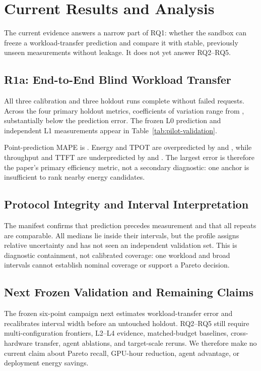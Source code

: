 \section{Current Results and Analysis}

The current evidence answers a narrow part of RQ1: whether the sandbox can
freeze a workload-transfer prediction and compare it with stable, previously
unseen measurements without leakage.  It does not yet answer RQ2--RQ5.

\subsection{R1a: End-to-End Blind Workload Transfer}

All three calibration and three holdout runs complete without failed requests.
Across the four primary holdout metrics, coefficients of variation range from
\PilotCVRange{}, substantially below the prediction error.  The frozen L0
prediction and independent L1 measurements appear in
Table~\ref{tab:pilot-validation}.



Point-prediction MAPE is \PilotMeanMAPE{}.  Energy and TPOT are overpredicted by
\PilotEnergyAPE{} and \PilotTPOTAPE{}, while throughput and TTFT are
underpredicted by \PilotThroughputAPE{} and \PilotTTFTAPE{}.  The largest error
is therefore the paper's primary efficiency metric, not a secondary diagnostic:
one anchor is insufficient to rank nearby energy candidates.

\subsection{Protocol Integrity and Interval Interpretation}

The manifest confirms that prediction precedes measurement and that all repeats
are comparable.  All \PilotCoverage{} medians lie inside their intervals, but
the profile assigns \PilotRelativeUncertainty{} relative uncertainty and has
not seen an independent validation set.  This is diagnostic containment, not
calibrated coverage: one workload and broad intervals cannot establish nominal
coverage or support a Pareto decision.

\subsection{Next Frozen Validation and Remaining Claims}

The frozen six-point campaign next estimates workload-transfer error and
recalibrates interval width before an untouched holdout.  RQ2--RQ5 still require
multi-configuration frontiers, L2--L4 evidence, matched-budget baselines,
cross-hardware transfer, agent ablations, and target-scale reruns.  We therefore
make no current claim about Pareto recall, GPU-hour reduction, agent advantage,
or deployment energy savings.
